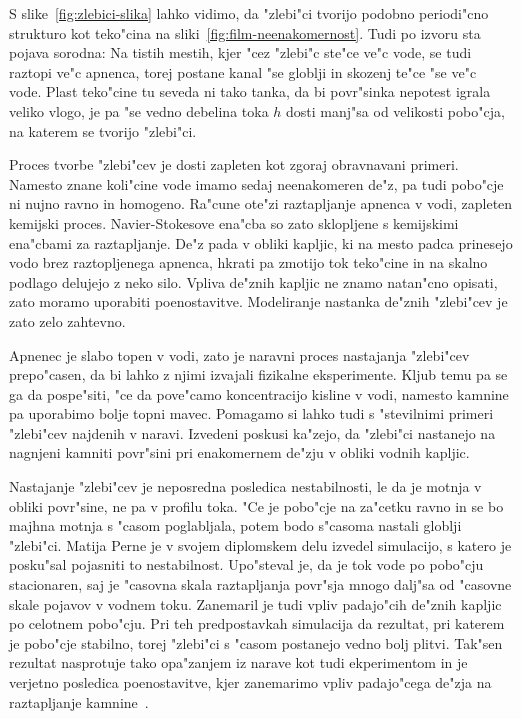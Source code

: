 \documentclass[a4paper,10pt]{article}
\begin{document}
S slike~\ref{fig:zlebici-slika} lahko vidimo, da "zlebi"ci tvorijo podobno periodi"cno strukturo kot teko"cina na sliki~\ref{fig:film-neenakomernost}. Tudi po izvoru sta pojava sorodna: Na tistih mestih, kjer "cez "zlebi"c ste"ce ve"c vode, se tudi raztopi ve"c apnenca, torej postane kanal "se globlji in skozenj te"ce "se ve"c vode. Plast teko"cine tu seveda ni tako tanka, da bi povr"sinka nepotest igrala veliko vlogo, je pa "se vedno debelina toka $h$ dosti manj"sa od velikosti pobo"cja, na katerem se tvorijo "zlebi"ci. 

Proces tvorbe "zlebi"cev je dosti zapleten kot zgoraj obravnavani primeri. Namesto znane koli"cine vode imamo sedaj neenakomeren de"z, pa tudi pobo"cje ni nujno ravno in homogeno. Ra"cune ote"zi raztapljanje apnenca v vodi, zapleten kemijski proces. Navier-Stokesove ena"cba so zato sklopljene s kemijskimi ena"cbami za raztapljanje. De"z pada v obliki kapljic, ki na mesto padca prinesejo vodo brez raztopljenega apnenca, hkrati pa zmotijo tok teko"cine in na skalno podlago delujejo z neko silo. Vpliva de"znih kapljic ne znamo natan"cno opisati, zato moramo uporabiti poenostavitve. Modeliranje nastanka de"znih "zlebi"cev je zato zelo zahtevno. 

Apnenec je slabo topen v vodi, zato je naravni proces nastajanja "zlebi"cev prepo"casen, da bi lahko z njimi izvajali fizikalne eksperimente. Kljub temu pa se ga da pospe"siti, "ce da pove"camo koncentracijo kisline v vodi, namesto kamnine pa uporabimo bolje topni mavec. Pomagamo si lahko tudi s "stevilnimi primeri "zlebi"cev najdenih v naravi. Izvedeni poskusi ka"zejo, da "zlebi"ci nastanejo na nagnjeni kamniti povr"sini pri enakomernem de"zju v obliki vodnih kapljic.

Nastajanje "zlebi"cev je neposredna posledica nestabilnosti, le da je motnja v obliki povr"sine, ne pa v profilu toka. "Ce je pobo"cje na za"cetku ravno in se bo majhna motnja s "casom poglabljala, potem bodo s"casoma nastali globlji "zlebi"ci. Matija Perne je v svojem diplomskem delu izvedel simulacijo, s katero je posku"sal pojasniti to nestabilnost. Upo"steval je, da je tok vode po pobo"cju stacionaren, saj je "casovna skala raztapljanja povr"sja mnogo dalj"sa od "casovne skale pojavov v vodnem toku. Zanemaril je tudi vpliv padajo"cih de"znih kapljic po celotnem pobo"cju. Pri teh predpostavkah simulacija da rezultat, pri katerem je pobo"cje stabilno, torej "zlebi"ci s "casom postanejo vedno bolj plitvi. Tak"sen rezultat nasprotuje tako opa"zanjem iz narave kot tudi ekperimentom in je verjetno posledica poenostavitve, kjer zanemarimo vpliv padajo"cega de"zja na raztapljanje kamnine~\cite{perne}. 
\end{document}
